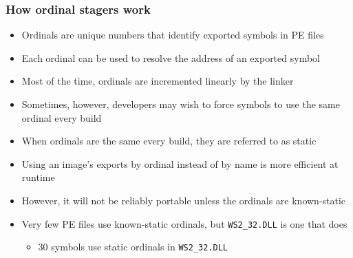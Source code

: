 \documentclass{beamer}
\newenvironment{sitemize}{\vspace{1mm}\begin{itemize}\itemsep 4pt\small}{\end{itemize}}
\begin{document}
\begin{frame}[t]
    \frametitle{How ordinal stagers work}

    \begin{sitemize}
        \item Ordinals are unique numbers that identify exported
        symbols in PE files
        \item Each ordinal can be used to resolve the address of an
        exported symbol

        \pause
        \item Most of the time, ordinals are incremented linearly by the
        linker
        \item Sometimes, however, developers may wish to force
        symbols to use the same ordinal every build
        \item When ordinals are the same every build, they are
        referred to as static

        \pause
        \item Using an image's exports by ordinal instead of by name
        is more efficient at runtime
        \item However, it will not be reliably portable unless the
        ordinals are known-static

        \pause
        \item Very few PE files use known-static ordinals, but
        \texttt{WS2\_32.DLL} is one that does
        \begin{sitemize}
            \item 30 symbols use static ordinals in
            \texttt{WS2\_32.DLL}
        \end{sitemize}
    \end{sitemize}
\end{frame}
\end{document}
